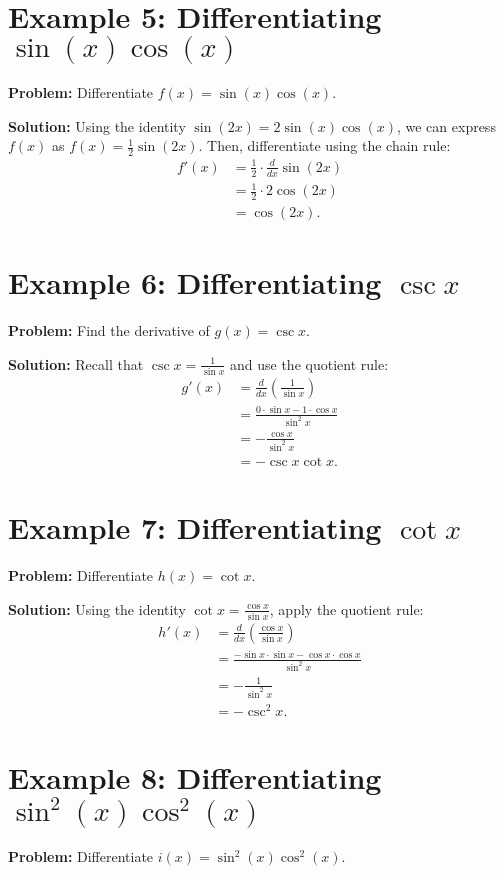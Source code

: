 \documentclass[a4paper,12pt]{book}
\begin{document}


\section*{Example 5: Differentiating $\sin(x)\cos(x)$}
\textbf{Problem:} Differentiate $f(x) = \sin(x)\cos(x)$.

\textbf{Solution:}
Using the identity $\sin(2x) = 2\sin(x)\cos(x)$, we can express $f(x)$ as $f(x) = \frac{1}{2}\sin(2x)$. Then, differentiate using the chain rule:
\begin{align*}
f'(x) &= \frac{1}{2} \cdot \frac{d}{dx} \sin(2x) \\
&= \frac{1}{2} \cdot 2\cos(2x) \\
&= \cos(2x).
\end{align*}

\section*{Example 6: Differentiating $\csc x$}
\textbf{Problem:} Find the derivative of $g(x) = \csc x$.

\textbf{Solution:}
Recall that $\csc x = \frac{1}{\sin x}$ and use the quotient rule:
\begin{align*}
g'(x) &= \frac{d}{dx} \left( \frac{1}{\sin x} \right) \\
&= \frac{0 \cdot \sin x - 1 \cdot \cos x}{\sin^2 x} \\
&= -\frac{\cos x}{\sin^2 x} \\
&= -\csc x \cot x.
\end{align*}

\section*{Example 7: Differentiating $\cot x$}
\textbf{Problem:} Differentiate $h(x) = \cot x$.

\textbf{Solution:}
Using the identity $\cot x = \frac{\cos x}{\sin x}$, apply the quotient rule:
\begin{align*}
h'(x) &= \frac{d}{dx} \left( \frac{\cos x}{\sin x} \right) \\
&= \frac{-\sin x \cdot \sin x - \cos x \cdot \cos x}{\sin^2 x} \\
&= -\frac{1}{\sin^2 x} \\
&= -\csc^2 x.
\end{align*}

\section*{Example 8: Differentiating $\sin^2(x)\cos^2(x)$}
\textbf{Problem:} Differentiate $i(x) = \sin^2(x)\cos^2(x)$.
\end{document}
